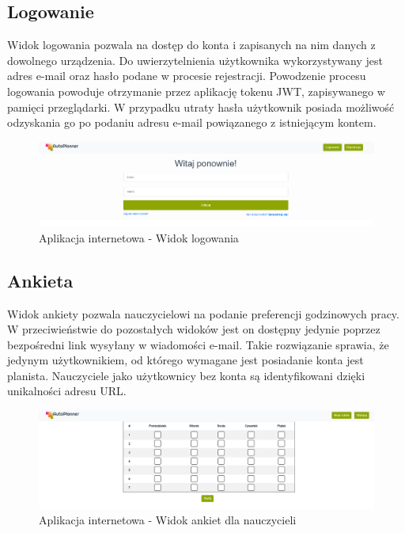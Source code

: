\subsection{Logowanie}
Widok logowania pozwala na dostęp do konta i zapisanych na nim danych z dowolnego urządzenia. Do uwierzytelnienia użytkownika wykorzystywany jest adres e-mail oraz hasło podane w procesie rejestracji. Powodzenie procesu logowania powoduje otrzymanie przez aplikację tokenu JWT, zapisywanego w pamięci przeglądarki. W przypadku utraty hasła użytkownik posiada możliwość odzyskania go po podaniu adresu e-mail powiązanego z istniejącym kontem.
\begin{figure}[!ht]
\centering\includegraphics[width=\textwidth]{figures/login}
\caption{Aplikacja internetowa - Widok logowania}\label{rys:login}
\end{figure}
\clearpage
\subsection{Ankieta}
Widok ankiety pozwala nauczycielowi na podanie preferencji godzinowych pracy. W przeciwieństwie do pozostałych widoków jest on dostępny jedynie poprzez bezpośredni link wysyłany w wiadomości e-mail. Takie rozwiązanie sprawia, że jedynym użytkownikiem, od którego wymagane jest posiadanie konta jest planista. Nauczyciele jako użytkownicy bez konta są identyfikowani dzięki unikalności adresu URL.
\begin{figure}[!ht]
\centering\includegraphics[width=\textwidth]{figures/poll}
\caption{Aplikacja internetowa - Widok ankiet dla nauczycieli}\label{rys:poll}
\end{figure}
